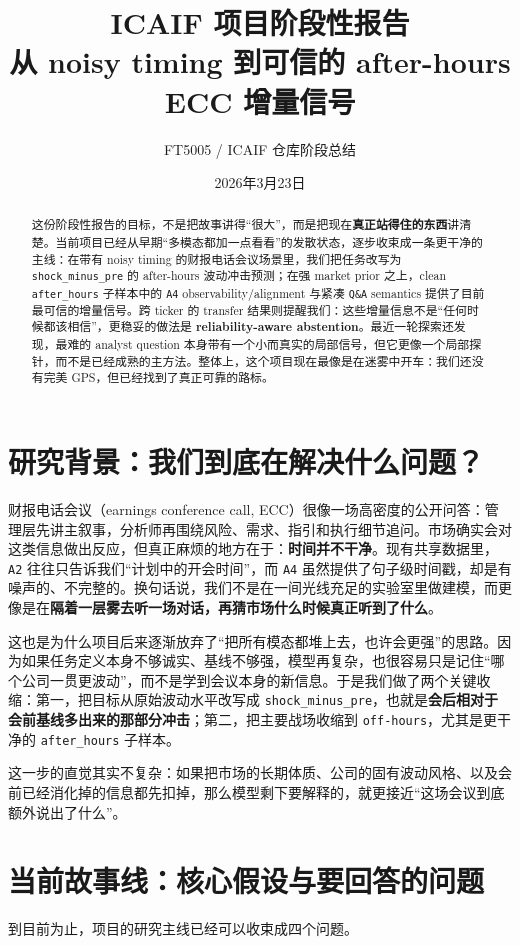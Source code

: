 \documentclass[11pt]{ctexart}
\title{ICAIF 项目阶段性报告\\\large 从 noisy timing 到可信的 after-hours ECC 增量信号}
\author{FT5005 / ICAIF 仓库阶段总结}
\date{2026年3月23日}
\begin{document}
\maketitle

\begin{abstract}
这份阶段性报告的目标，不是把故事讲得“很大”，而是把现在\textbf{真正站得住的东西}讲清楚。当前项目已经从早期“多模态都加一点看看”的发散状态，逐步收束成一条更干净的主线：在带有 noisy timing 的财报电话会议场景里，我们把任务改写为 \texttt{shock\_minus\_pre} 的 after-hours 波动冲击预测；在强 market prior 之上，clean \texttt{after\_hours} 子样本中的 \texttt{A4} observability/alignment 与紧凑 \texttt{Q\&A} semantics 提供了目前最可信的增量信号。跨 ticker 的 transfer 结果则提醒我们：这些增量信息不是“任何时候都该相信”，更稳妥的做法是 \textbf{reliability-aware abstention}。最近一轮探索还发现，最难的 analyst question 本身带有一个小而真实的局部信号，但它更像一个局部探针，而不是已经成熟的主方法。整体上，这个项目现在最像是在迷雾中开车：我们还没有完美 GPS，但已经找到了真正可靠的路标。
\end{abstract}

\section{研究背景：我们到底在解决什么问题？}
财报电话会议（earnings conference call, ECC）很像一场高密度的公开问答：管理层先讲主叙事，分析师再围绕风险、需求、指引和执行细节追问。市场确实会对这类信息做出反应，但真正麻烦的地方在于：\textbf{时间并不干净}。现有共享数据里，\texttt{A2} 往往只告诉我们“计划中的开会时间”，而 \texttt{A4} 虽然提供了句子级时间戳，却是有噪声的、不完整的。换句话说，我们不是在一间光线充足的实验室里做建模，而更像是在\textbf{隔着一层雾去听一场对话，再猜市场什么时候真正听到了什么}。

这也是为什么项目后来逐渐放弃了“把所有模态都堆上去，也许会更强”的思路。因为如果任务定义本身不够诚实、基线不够强，模型再复杂，也很容易只是记住“哪个公司一贯更波动”，而不是学到会议本身的新信息。于是我们做了两个关键收缩：第一，把目标从原始波动水平改写成 \texttt{shock\_minus\_pre}，也就是\textbf{会后相对于会前基线多出来的那部分冲击}；第二，把主要战场收缩到 \texttt{off-hours}，尤其是更干净的 \texttt{after\_hours} 子样本。

这一步的直觉其实不复杂：如果把市场的长期体质、公司的固有波动风格、以及会前已经消化掉的信息都先扣掉，那么模型剩下要解释的，就更接近“这场会议到底额外说出了什么”。

\section{当前故事线：核心假设与要回答的问题}
到目前为止，项目的研究主线已经可以收束成四个问题。
\end{document}
